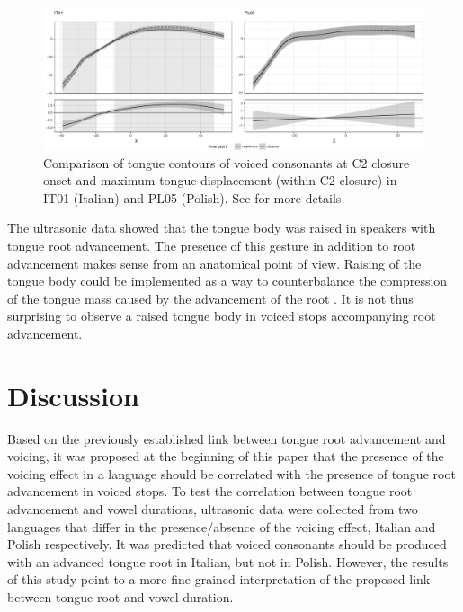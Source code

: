 \documentclass[authoryear, twocolumn]{elsarticle}
\begin{document}
\begin{figure}
    \centering
    \includegraphics[width=.9\textwidth]{fig/voiced.pdf}
    \caption{Comparison of tongue contours of voiced consonants at C2 closure onset and maximum tongue displacement (within C2 closure) in IT01 (Italian) and PL05 (Polish). See  for more details.}
    \label{f:voiced}
\end{figure}

The ultrasonic data showed that the tongue body was raised in speakers
with tongue root advancement. The presence of this gesture in addition
to root advancement makes sense from an anatomical point of view.
Raising of the tongue body could be implemented as a way to
counterbalance the compression of the tongue mass caused by the
advancement of the root
\citep{perkell1969, jackson1988, kingston1997, fulop1998}. It is not
thus surprising to observe a raised tongue body in voiced stops
accompanying root advancement.

\section{Discussion}\label{discussion}

\label{s:discussion}

Based on the previously established link between tongue root advancement
and voicing, it was proposed at the beginning of this paper that the
presence of the voicing effect in a language should be correlated with
the presence of tongue root advancement in voiced stops. To test the
correlation between tongue root advancement and vowel durations,
ultrasonic data were collected from two languages that differ in the
presence/absence of the voicing effect, Italian and Polish respectively.
It was predicted that voiced consonants should be produced with an
advanced tongue root in Italian, but not in Polish. However, the results
of this study point to a more fine-grained interpretation of the
proposed link between tongue root and vowel duration.
\end{document}
